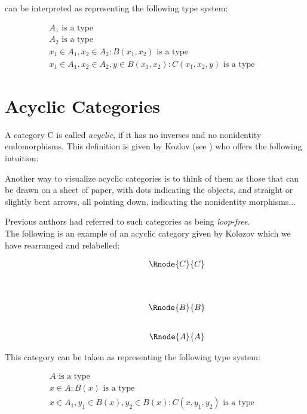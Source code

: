 \documentclass[10pt,a4paper]{scrartcl}
\begin{document}
\noindent can be interpreted as representing the following type system:

\begin{align}
&A_1\mbox{ is a type} && \tag*{(\theequation a)}\\
&A_2\mbox{ is a type} && \tag*{(\theequation b)}\\
&x_1\in A_1, x_2 \in A_2 : B(x_1,x_2) \mbox{ is a type} && \tag*{(\theequation c)}\\
&x_1\in A_1, x_2 \in A_2, y \in B(x_1,x_2): C(x_1,x_2,y) \mbox{ is a type} && \tag*{(\theequation d)}
\end{align}


\section {Acyclic Categories}
A category C is called \textit{acyclic}, if it has no inverses and no nonidentity
endomorphisms. This definition is given by Kozlov (see \cite{Kozlov2007}) who offers the following intuition:
\begin{erquote}
Another way to visualize acyclic categories is to think of them as those
that can be drawn on a sheet of paper, with dots indicating the objects, and
straight or slightly bent arrows, all pointing down, indicating the nonidentity
morphisms...
\end{erquote}


\noindent
Previous authors had referred to such categories as being \textit{loop-free}. \\

\noindent
The following is an example of an acyclic category given by Kolozov which we have rearranged and relabelled:

\begin{center}
\begin{equation}
\begin{array}{p{1.5cm}cccp{2cm}c}
&                & \Rnode{C}{C}&   \\ [1.4cm]
&                & \Rnode{B}{B} &  \\ [0.8cm]
&                & \Rnode{A}{A} &  
\end{array}
\end{equation}
\setlength {\saroffsetA}{-2pt}
\setlength {\saroffsetB}{-2pt}
\sarreset
\end{center}


\noindent This category can be taken as representing the following type system:
\addtocounter{equation}{-1}
\begin{align}
&A\mbox{ is a type} && \tag*{(\theequation a)}\\
&x\in A: B(x) \mbox{ is a type} && \tag*{(\theequation b)}\\
&x\in A_1, y_1 \in B(x), y_2 \in B(x) : C(x,y_1,y_2) \mbox{ is a type} && \tag*{(\theequation c)}
\end{align}
\end{document}

